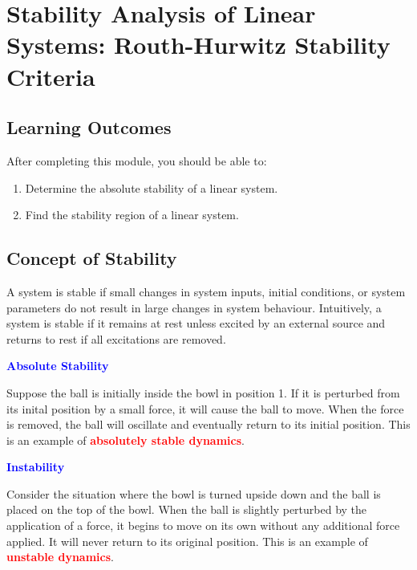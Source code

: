 \documentclass[
  14pt,
  a4paper,
  oneside,
  open=any,
  a4paper,
  14pt]{report}
\begin{document}
\chapter{Stability Analysis of Linear Systems: Routh-Hurwitz Stability
Criteria}\label{stability-analysis-of-linear-systems-routh-hurwitz-stability-criteria}

\section*{Learning Outcomes}\label{learning-outcomes-4}


After completing this module, you should be able to:

\begin{enumerate}
\def\labelenumi{\arabic{enumi}.}
\item
  Determine the absolute stability of a linear system.
\item
  Find the stability region of a linear system.
\end{enumerate}

\section{Concept of Stability}\label{concept-of-stability}

A system is stable if small changes in system inputs, initial
conditions, or system parameters do not result in large changes in
system behaviour. Intuitively, a system is stable if it remains at rest
unless excited by an external source and returns to rest if all
excitations are removed.

\textcolor{blue}{\textbf{Absolute Stability}}

Suppose the ball is initially inside the bowl in position 1. If it is
perturbed from its inital position by a small force, it will cause the
ball to move. When the force is removed, the ball will oscillate and
eventually return to its initial position. This is an example of
\textcolor{red}{\textbf{absolutely stable dynamics}}.

\textcolor{blue}{\textbf{Instability}}

Consider the situation where the bowl is turned upside down and the ball
is placed on the top of the bowl. When the ball is slightly perturbed by
the application of a force, it begins to move on its own without any
additional force applied. It will never return to its original position.
This is an example of \textcolor{red}{\textbf{unstable dynamics}}.
\end{document}
